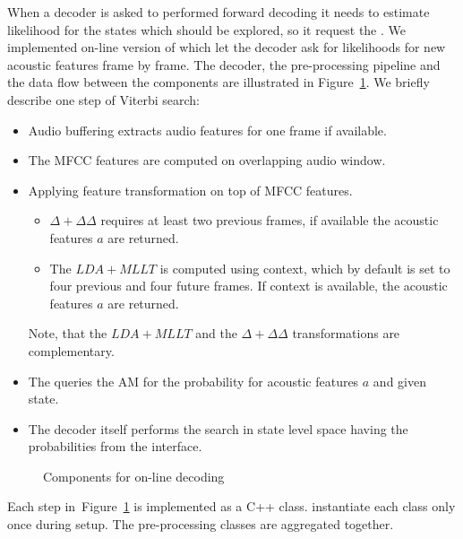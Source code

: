When a decoder is asked to performed forward decoding it needs to estimate likelihood for the states which should be explored, so it request the .
We implemented on-line version of  which let the decoder ask for likelihoods for new acoustic features frame by frame.
The decoder, the pre-processing pipeline and the data flow between the components are illustrated in Figure~\ref{fig:online_pipeline}.
We briefly describe one step of Viterbi search:
\begin{itemize}
    \item Audio buffering extracts audio features for one frame if available. 
    \item The \ac{MFCC} features are computed on overlapping audio window.
    \item Applying feature transformation on top of \ac{MFCC} features. 
        \begin{itemize}
            \item $\Delta + \Delta\Delta$ requires at least two previous frames, if available the acoustic features $a$ are returned. 
            \item The $LDA+MLLT$ is computed using context, which by default is set to four previous and four future frames. If context is available, the acoustic features $a$ are returned.
        \end{itemize}
        Note, that the $LDA+MLLT$ and the $\Delta+\Delta\Delta$ transformations are complementary.
    \item The  queries the \ac{AM} for the probability for acoustic features $a$ and given state.
    \item The decoder itself performs the search in state level space having the probabilities from the  interface. 
\end{itemize}

\begin{figure}[!htp]
    \begin{center}
        
        \caption{Components for on-line decoding}
    \label{fig:online_pipeline} 
    \end{center}
\end{figure}

Each step in~Figure~\ref{fig:online_pipeline} is implemented as a C++ class.
 instantiate each class only once during setup.
The pre-processing classes are aggregated together.


